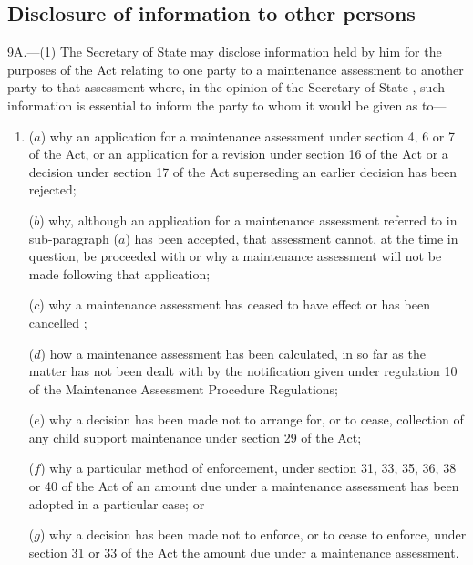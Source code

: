 \documentclass[a4paper,12pt]{article}
\begin{document}
\subsection[9A. Disclosure of information to other persons]{Disclosure of information to other persons}

9A.—(1) The Secretary of State 
may disclose information 
held by him for the purposes of the Act relating to  %
one party to a maintenance assessment to another party to that assessment where, in the opinion of the Secretary of State%
, such information is essential to inform the party to whom it would be given as to—
\begin{enumerate}\item[]
($a$) why an application for a maintenance assessment under section 4, 6 or 7 of the Act, or an application for a 
revision under section 16 of the Act or a decision under section 17 of the Act superseding an earlier decision  %
has been rejected;

($b$) why, although an application for a maintenance assessment referred to in sub-paragraph ($a$) has been accepted, that assessment cannot, at the time in question, be proceeded with or why a maintenance assessment will not be made following that application;

($c$) why a maintenance assessment has ceased to have effect or has been cancelled%
;

($d$) how a maintenance assessment has been calculated, in so far as the matter has not been dealt with by the notification given under regulation 10 of the Maintenance Assessment Procedure Regulations;

($e$) why a decision has been made not to arrange for, or to cease, collection of any child support maintenance under section 29 of the Act;

($f$) why a particular method of enforcement, under section 31, 33, 35, 36, 38 or 40 of the Act of an amount due under a maintenance assessment has been adopted in a particular case; or

($g$) why a decision has been made not to enforce, or to cease to enforce, under section 31 or 33 of the Act the amount due under a maintenance assessment.
\end{enumerate}
\end{document}

